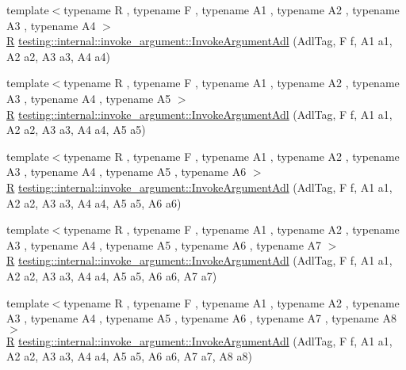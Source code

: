 \begin{DoxyCompactItemize}
\item 
{\footnotesize template$<$typename R , typename F , typename A1 , typename A2 , typename A3 , typename A4 $>$ }\\\hyperlink{typedefs__9_8js_afb423b73ee7b6c04d2d54fc06e405404}{R} \hyperlink{namespacetesting_1_1internal_1_1invoke__argument_aace931066a0efe189d7a0c69f06b74ec}{testing\+::internal\+::invoke\+\_\+argument\+::\+Invoke\+Argument\+Adl} (Adl\+Tag, F f, A1 a1, A2 a2, A3 a3, A4 a4)
\item 
{\footnotesize template$<$typename R , typename F , typename A1 , typename A2 , typename A3 , typename A4 , typename A5 $>$ }\\\hyperlink{typedefs__9_8js_afb423b73ee7b6c04d2d54fc06e405404}{R} \hyperlink{namespacetesting_1_1internal_1_1invoke__argument_a371c08ae03d150520e8bda58fb4574c3}{testing\+::internal\+::invoke\+\_\+argument\+::\+Invoke\+Argument\+Adl} (Adl\+Tag, F f, A1 a1, A2 a2, A3 a3, A4 a4, A5 a5)
\item 
{\footnotesize template$<$typename R , typename F , typename A1 , typename A2 , typename A3 , typename A4 , typename A5 , typename A6 $>$ }\\\hyperlink{typedefs__9_8js_afb423b73ee7b6c04d2d54fc06e405404}{R} \hyperlink{namespacetesting_1_1internal_1_1invoke__argument_a16bf1b90d183210a82fbbef4e2eef1c5}{testing\+::internal\+::invoke\+\_\+argument\+::\+Invoke\+Argument\+Adl} (Adl\+Tag, F f, A1 a1, A2 a2, A3 a3, A4 a4, A5 a5, A6 a6)
\item 
{\footnotesize template$<$typename R , typename F , typename A1 , typename A2 , typename A3 , typename A4 , typename A5 , typename A6 , typename A7 $>$ }\\\hyperlink{typedefs__9_8js_afb423b73ee7b6c04d2d54fc06e405404}{R} \hyperlink{namespacetesting_1_1internal_1_1invoke__argument_a77f581ed8b270ed4752d49d5bdd59e84}{testing\+::internal\+::invoke\+\_\+argument\+::\+Invoke\+Argument\+Adl} (Adl\+Tag, F f, A1 a1, A2 a2, A3 a3, A4 a4, A5 a5, A6 a6, A7 a7)
\item 
{\footnotesize template$<$typename R , typename F , typename A1 , typename A2 , typename A3 , typename A4 , typename A5 , typename A6 , typename A7 , typename A8 $>$ }\\\hyperlink{typedefs__9_8js_afb423b73ee7b6c04d2d54fc06e405404}{R} \hyperlink{namespacetesting_1_1internal_1_1invoke__argument_a43c35b90896110940a0cc41c337ca306}{testing\+::internal\+::invoke\+\_\+argument\+::\+Invoke\+Argument\+Adl} (Adl\+Tag, F f, A1 a1, A2 a2, A3 a3, A4 a4, A5 a5, A6 a6, A7 a7, A8 a8)
\item 

\end{DoxyCompactItemize}
